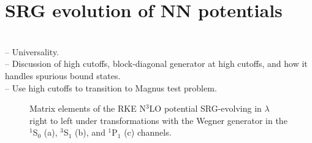 \documentclass[preprintnumbers,floatfix,aps,prc,preprint,nofootinbib]{revtex4-1}
\begin{document}
\section{SRG evolution of NN potentials}
\label{sec:srg_evolution_nn_potentials}


\\
-- Universality.
\\
-- Discussion of high cutoffs, block-diagonal generator at high cutoffs, and how it handles spurious bound states.
\\
-- Use high cutoffs to transition to Magnus test problem.
%
\begin{figure}[H]
	\centering
	

	\caption{Matrix elements of the RKE N$^3$LO potential SRG-evolving in $\lambda$ right to left under transformations with the Wegner generator in the $^1$S$_0$ (a), $^3$S$_1$ (b), and $^1$P$_1$ (c) channels.}
	\label{potential_contours_RKE_Wegner}
\end{figure}
\end{document}
